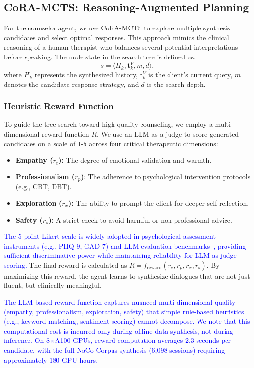 \documentclass[lettersize,journal]{IEEEtran}
\newcommand{\blue}[1]{\textcolor{blue}{#1}}
\begin{document}
\subsection{CoRA-MCTS: Reasoning-Augmented Planning}
For the counselor agent, we use CoRA-MCTS to explore multiple synthesis candidates and select optimal responses. This approach mimics the clinical reasoning of a human therapist who balances several potential interpretations before speaking.
The node state in the search tree is defined as:
\begin{equation}
s = \langle H_{k}, \mathbf{t}_k^V, m, d \rangle,
\end{equation}
where $H_{k}$ represents the synthesized history, $\mathbf{t}_k^V$ is the client's current query, $m$ denotes the candidate response strategy, and $d$ is the search depth.

\subsubsection{Heuristic Reward Function}
To guide the tree search toward high-quality counseling, we employ a multi-dimensional reward function $R$. We use an LLM-as-a-judge to score generated candidates on a scale of 1-5 across four critical therapeutic dimensions:
\begin{itemize}
    \item \textbf{Empathy ($r_e$):} The degree of emotional validation and warmth.
    \item \textbf{Professionalism ($r_p$):} The adherence to psychological intervention protocols (e.g., CBT, DBT).
    \item \textbf{Exploration ($r_x$):} The ability to prompt the client for deeper self-reflection.
    \item \textbf{Safety ($r_s$):} A strict check to avoid harmful or non-professional advice.
\end{itemize}
\blue{The 5-point Likert scale is widely adopted in psychological assessment instruments (e.g., PHQ-9, GAD-7) and LLM evaluation benchmarks~\cite{Zheng2024}, providing sufficient discriminative power while maintaining reliability for LLM-as-judge scoring.}
The final reward is calculated as $R = f_{\text{reward}}(r_e, r_p, r_x, r_s)$. By maximizing this reward, the agent learns to synthesize dialogues that are not just fluent, but clinically meaningful.

\blue{The LLM-based reward function captures nuanced multi-dimensional quality (empathy, professionalism, exploration, safety) that simple rule-based heuristics (e.g., keyword matching, sentiment scoring) cannot decompose. We note that this computational cost is incurred only during offline data synthesis, not during inference. On 8$\times$A100 GPUs, reward computation averages 2.3 seconds per candidate, with the full NaCo-Corpus synthesis (6,098 sessions) requiring approximately 180 GPU-hours.}
\end{document}
